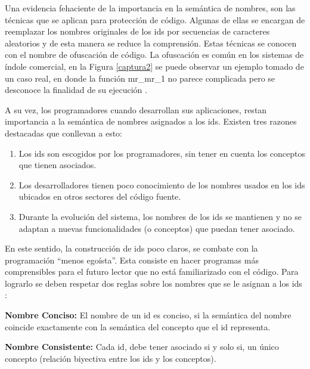 Una evidencia fehaciente de la importancia en la semántica de nombres, son las técnicas que se aplican para protección de código. Algunas de ellas se encargan de reemplazar los nombres originales de los ids por secuencias de caracteres aleatorios y de esta manera se reduce la comprensión. Estas técnicas se conocen con el nombre de ofuscación de código. La ofuscación es común en los sistemas de índole comercial, en la Figura \ref{captura2} se puede observar un ejemplo tomado de un caso real, en donde la función \textsf{mr\_mr\_1} no parece complicada pero se desconoce la finalidad de su ejecución \cite{DFPM05}.

A su vez, los programadores cuando desarrollan sus aplicaciones, restan importancia a la semántica de nombres asignados a los ids. Existen tres razones destacadas que conllevan a esto:

\begin{enumerate}
\itemsep0em%
\item Los ids son escogidos por los programadores, sin tener en cuenta los conceptos que tienen asociados.

\item Los desarrolladores tienen poco conocimiento de los nombres usados en los ids ubicados en otros sectores del código fuente.

\item Durante la evolución del sistema, los nombres de los ids se mantienen y no se adaptan a nuevas funcionalidades (o conceptos) que puedan tener asociado.
\end{enumerate}

En este sentido, la construcción de ids poco claros, se combate con la programación “menos egoísta”. Esta consiste en hacer programas más comprensibles para el futuro lector que no está familiarizado con el código. Para lograrlo se deben respetar dos reglas sobre los nombres que se le asignan a los ids \cite{DFPM05,DLHD06}:

\begin{framed}
\noindent \textbf{Nombre Conciso:} El nombre de un id es conciso, si la semántica del nombre coincide exactamente con la semántica del concepto que el id representa.

\noindent \textbf{Nombre Consistente:} Cada id, debe tener asociado si y solo si, un único concepto (relación biyectiva entre los ids y los conceptos).
\end{framed}

